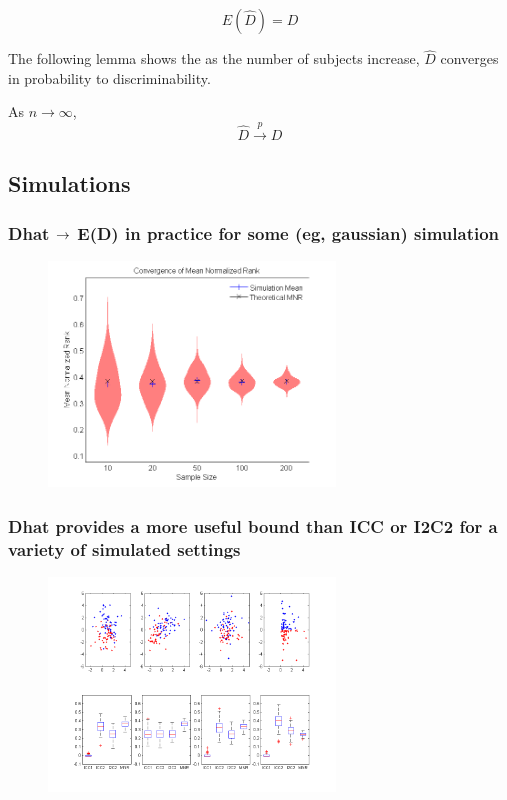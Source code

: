 \documentclass{article}
\begin{document}
\begin{lem}	
	\[ E(\hat{D}) = D\]
\end{lem}

The following lemma shows the as the number of subjects increase, $\hat{D}$ converges in probability to discriminability.
\begin{lem}	
As $n \rightarrow \infty$,
\[\hat{D} \overset{p}{\rightarrow} D \]
\end{lem}

\subsection{Simulations}

\subsubsection{Dhat $\rightarrow$ E(D) in practice for some (eg, gaussian) simulation}

\begin{figure}[t!]
\includegraphics[width=3.0in]{../Figs/simumnr_violin.png}
\caption{}
\label{fig:64}
\end{figure}




\subsubsection{Dhat provides a more useful bound than ICC or I2C2 for a variety of simulated settings}

\begin{figure}[t!]
\includegraphics[width=3.0in]{../Figs/Figure1_draft.png}
\caption{}
\label{fig:64}
\end{figure}
\end{document}
